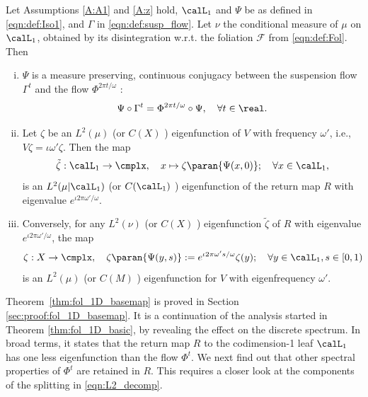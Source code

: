 \documentclass[12pt,oneside]{article}
\newcommand{\Fol}{\mathcal{F}}
\newcommand{\Return}{R}
\newcommand{\Iso}{\Psi}
\newcommand{\Susp}{\Gamma}
\begin{document}
\begin{theorem}\label{thm:fol_1D_basemap}
Let Assumptions \ref{A:A1} and \ref{A:z} hold, $\calL_1$ and $\Iso$ be as defined in \eqref{eqn:def:Iso1}, and $\Susp$ in \eqref{eqn:def:susp_flow}. Let $\nu$ the conditional measure of $\mu$ on $\calL_1$, obtained by its disintegration w.r.t. the foliation $\Fol$ from \ref{eqn:def:Fol}. Then 
\begin{enumerate}[(i)]
	\item $\Iso$ is a measure preserving, continuous conjugacy between the suspension flow $\Susp^t$ and the flow $\Phi^{2\pi t/\omega}$ :
     \[ \Iso\circ \Susp^t = \Phi^{2\pi t/\omega} \circ \Iso , \quad \forall t\in \real . \]
	\item Let $\zeta$ be an $L^2(\mu)$ (or $C(X)$ ) eigenfunction of $V$ with frequency $\omega'$, i.e., $V\zeta = \iota \omega' \zeta$. Then the map %
        \begin{equation} \label{eqn:def:base_map}
	   \tilde{\zeta} : \calL_1 \to \cmplx, \quad x \mapsto \zeta \paran{\Iso(x,0)}; \quad \forall x\in \calL_1,
	\end{equation}
	is an $L^2(\mu | \calL_1)$ (or $C(\calL_1)$ ) eigenfunction of the return map $\Return$ with eigenvalue  $e^{\iota 2\pi \omega'/\omega}$.
	\item Conversely, for any $L^2(\nu)$ (or $C(X)$ ) eigenfunction $\tilde{\zeta}$ of $\Return$ with eigenvalue $e^{\iota 2\pi \omega'/\omega}$, the map %
    \begin{equation}\label{eqn:def:tensor_with_base_map}
	\zeta :X\to\cmplx, \quad	\zeta\paran{ \Iso(y,s) } := e^{ \iota 2 \pi \omega' s/\omega} \zeta(y); \quad \forall y\in \calL_1, s\in [0,1)
    \end{equation}
    is an $L^2(\mu)$ (or $C(M)$ ) eigenfunction for $V$ with eigenfrequency $\omega'$.
\end{enumerate}
\end{theorem}

Theorem~\ref{thm:fol_1D_basemap} is proved in Section \ref{sec:proof:fol_1D_basemap}. It is a continuation of the analysis started in Theorem \ref{thm:fol_1D_basic}, by revealing the effect on the discrete spectrum. In broad terms, it states that the return map $\Return$ to the codimension-1 leaf $\calL_1$ has one less eigenfunction than the flow $\Phi^t$. We next find out that other spectral properties of $\Phi^t$ are retained in $\Return$. This requires a closer look at the components of the splitting in \eqref{eqn:L2_decomp}.
\end{document}
